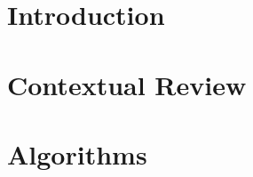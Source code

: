 
\part*{Introduction}\label{part:intro}

\part{Contextual Review}\label{part:contextual_review}

\part{Algorithms}\label{part:algorithms}

